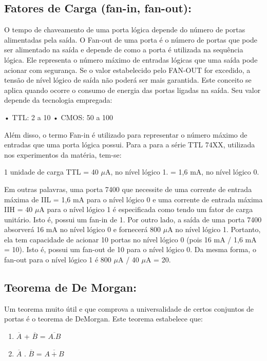 \documentclass[12pt]{article}
\begin{document}
	
	\subsection{ Fatores de Carga (fan-in, fan-out):}
	
	O tempo de chaveamento de uma porta lógica depende do número de portas alimentadas pela saída. O Fan-out de uma porta é o número de portas que pode ser alimentado na saída e depende de como a porta é utilizada na sequência lógica. Ele representa o número máximo de entradas lógicas que uma saída pode acionar com segurança. Se o valor estabelecido pelo FAN-OUT for excedido, a tensão de nível lógico de saída não poderá ser mais garantida. Este conceito se aplica quando ocorre o consumo de energia das portas ligadas na saída. Seu valor depende da tecnologia empregada: 
	
	• TTL: 2 a 10 
	• CMOS: 50 a 100
	
	Além disso, o termo Fan-in é utilizado para representar o número máximo de entradas que uma porta lógica possui. Para a para a série TTL 74XX, utilizada nos experimentos da matéria, tem-se: 
	
	1 unidade de carga TTL = 40 $\mu$A, no nível lógico 1. 
	= 1,6 mA, no nível lógico 0. 
	
	Em outras palavras, uma porta 7400 que necessite de uma corrente de entrada máxima de IIL = 1,6 mA para o nível lógico 0 e uma corrente de entrada máxima IIH = 40 $\mu$A para o nível lógico 1 é especificada como tendo um fator de carga unitário. Isto é, possui um fan-in de 1. Por outro lado, a saída de uma porta 7400 absorverá 16 mA no nível lógico 0 e fornecerá 800 $\mu$A no nível lógico 1. Portanto, ela tem capacidade de acionar 10 portas no nível lógico 0 (pois 16 mA / 1,6 mA = 10). Isto é, possui um fan-out de 10 para o nível lógico 0. Da mesma forma, o fan-out para o nível lógico 1 é 800 $\mu$A / 40 $\mu$A = 20.
	
	
	\subsection{Teorema de De Morgan:}
	
	Um teorema muito útil e que comprova a universalidade de certos conjuntos de portas é o teorema de DeMorgan. Este teorema estabelece que:
	
	\begin{enumerate}
		\item $\overline{A}$ + $\overline{B}$ = $\overline{A.B}$
		\item $\overline{A}$ . $\overline{B}$ = $\overline{A+B}$
	\end{enumerate}
	
\end{document}
